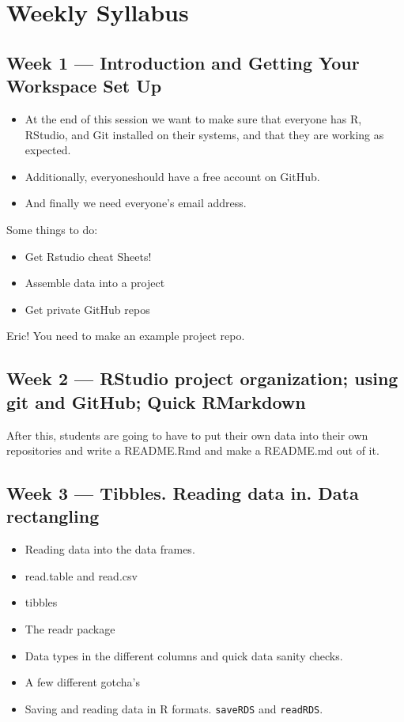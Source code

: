 \documentclass[]{book}
\providecommand{\tightlist}{%
  \setlength{\itemsep}{0pt}\setlength{\parskip}{0pt}}
\theoremstyle{definition}
\theoremstyle{definition}
\theoremstyle{remark}
\begin{document}
\section{Weekly Syllabus}\label{weekly-syllabus}

\subsection{Week 1 --- Introduction and Getting Your Workspace Set
Up}\label{week-1-introduction-and-getting-your-workspace-set-up}

\begin{itemize}
\tightlist
\item
  At the end of this session we want to make sure that everyone has R,
  RStudio, and Git installed on their systems, and that they are working
  as expected.
\item
  Additionally, everyoneshould have a free account on GitHub.
\item
  And finally we need everyone's email address.
\end{itemize}

Some things to do:

\begin{itemize}
\tightlist
\item
  Get Rstudio cheat Sheets!
\item
  Assemble data into a project
\item
  Get private GitHub repos
\end{itemize}

Eric! You need to make an example project repo.

\subsection{Week 2 --- RStudio project organization; using git and
GitHub; Quick
RMarkdown}\label{week-2-rstudio-project-organization-using-git-and-github-quick-rmarkdown}

After this, students are going to have to put their own data into their
own repositories and write a README.Rmd and make a README.md out of it.

\subsection{Week 3 --- Tibbles. Reading data in. Data
rectangling}\label{week-3-tibbles.-reading-data-in.-data-rectangling}

\begin{itemize}
\tightlist
\item
  Reading data into the data frames.
\item
  read.table and read.csv
\item
  tibbles
\item
  The readr package
\item
  Data types in the different columns and quick data sanity checks.
\item
  A few different gotcha's
\item
  Saving and reading data in R formats. \texttt{saveRDS} and
  \texttt{readRDS}.
\end{itemize}
\end{document}
